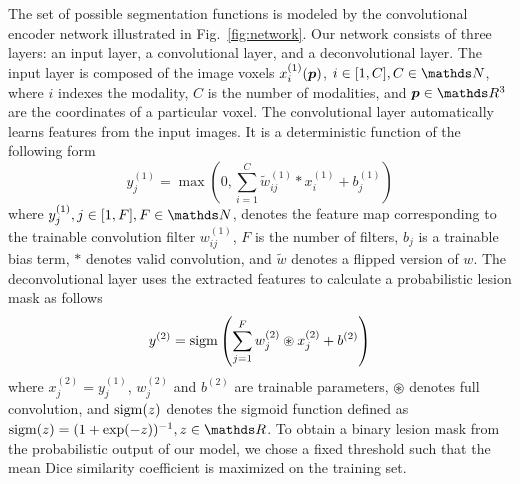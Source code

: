 The set of possible segmentation functions is modeled by the convolutional
encoder network illustrated in Fig.~\ref{fig:network}. Our network consists of
three layers: an input layer, a convolutional layer, and a deconvolutional
layer. The input layer is composed of the image voxels $x^{(1)}_i(\vect{p})$, $i
\in [1, C], C \in \N$, where $i$ indexes the modality, $C$ is the number of
modalities, and $\vect{p} \in \R^3$ are the coordinates of a particular voxel.
The convolutional layer automatically learns features from the input images. It
is a deterministic function of the following form
\begin{equation}
y^{(1)}_j = \max \left(0, \sum_{i=1}^{C}\tilde{w}^{(1)}_{ij}*x^{(1)}_i +
b^{(1)}_j\right)
\end{equation}
where $y^{(1)}_j, j \in [1, F], F \in \N$, denotes the feature map corresponding
to the trainable convolution filter $w^{(1)}_{ij}$, $F$ is the number of
filters, $b_j$ is a trainable bias term, $*$ denotes valid convolution, and
$\tilde{w}$ denotes a flipped version of $w$. The deconvolutional layer uses the
extracted features to calculate a probabilistic lesion mask as follows
\begin{equation}
y^{(2)} = \operatorname{sigm}\left(\sum_{j=1}^Fw^{(2)}_{j}\circledast x^{(2)}_j +
b^{(2)}\right)
\end{equation}
where $x^{(2)}_j = y^{(1)}_j$, $w^{(2)}_j$ and $b^{(2)}$ are trainable
parameters, $\circledast$ denotes full convolution, and $\operatorname{sigm}(z)$ denotes the
sigmoid function defined as $\sigm(z) = (1 + \exp(-z))^{-1}, z \in \R$. To
obtain a binary lesion mask from the probabilistic output of our model, we chose
a fixed threshold such that the mean Dice similarity coefficient is
maximized on the training set.

